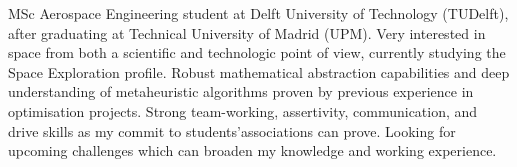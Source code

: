 \documentclass[letter,10pt]{article}
\begin{document}
\justifying

MSc Aerospace Engineering student at Delft University of Technology (TUDelft), after graduating at Technical University of Madrid (UPM). Very interested in space from both a scientific and technologic point of view, currently studying the Space Exploration profile. Robust mathematical abstraction capabilities and deep understanding of metaheuristic algorithms proven by previous experience in optimisation projects. Strong team-working, assertivity, communication, and drive skills as my commit to students’associations can prove. Looking for upcoming challenges which can broaden my knowledge and working experience.
\end{document}
